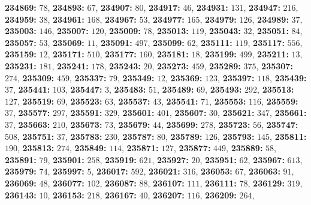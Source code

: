 \textsf{\bfseries 234869:} $78$, \textsf{\bfseries 234893:} $67$, \textsf{\bfseries 234907:} $80$, \textsf{\bfseries 234917:} $46$, \textsf{\bfseries 234931:} $131$, \textsf{\bfseries 234947:} $216$, \textsf{\bfseries 234959:} $38$, \textsf{\bfseries 234961:} $168$, \textsf{\bfseries 234967:} $53$, \textsf{\bfseries 234977:} $165$, \textsf{\bfseries 234979:} $126$, \textsf{\bfseries 234989:} $37$, \textsf{\bfseries 235003:} $146$, \textsf{\bfseries 235007:} $120$, \textsf{\bfseries 235009:} $78$, \textsf{\bfseries 235013:} $119$, \textsf{\bfseries 235043:} $32$, \textsf{\bfseries 235051:} $84$, \textsf{\bfseries 235057:} $53$, \textsf{\bfseries 235069:} $11$, \textsf{\bfseries 235091:} $497$, \textsf{\bfseries 235099:} $62$, \textsf{\bfseries 235111:} $119$, \textsf{\bfseries 235117:} $556$, \textsf{\bfseries 235159:} $12$, \textsf{\bfseries 235171:} $510$, \textsf{\bfseries 235177:} $160$, \textsf{\bfseries 235181:} $18$, \textsf{\bfseries 235199:} $499$, \textsf{\bfseries 235211:} $13$, \textsf{\bfseries 235231:} $181$, \textsf{\bfseries 235241:} $178$, \textsf{\bfseries 235243:} $20$, \textsf{\bfseries 235273:} $459$, \textsf{\bfseries 235289:} $375$, \textsf{\bfseries 235307:} $274$, \textsf{\bfseries 235309:} $459$, \textsf{\bfseries 235337:} $79$, \textsf{\bfseries 235349:} $12$, \textsf{\bfseries 235369:} $123$, \textsf{\bfseries 235397:} $118$, \textsf{\bfseries 235439:} $37$, \textsf{\bfseries 235441:} $103$, \textsf{\bfseries 235447:} $3$, \textsf{\bfseries 235483:} $51$, \textsf{\bfseries 235489:} $69$, \textsf{\bfseries 235493:} $292$, \textsf{\bfseries 235513:} $127$, \textsf{\bfseries 235519:} $69$, \textsf{\bfseries 235523:} $63$, \textsf{\bfseries 235537:} $43$, \textsf{\bfseries 235541:} $71$, \textsf{\bfseries 235553:} $116$, \textsf{\bfseries 235559:} $37$, \textsf{\bfseries 235577:} $297$, \textsf{\bfseries 235591:} $329$, \textsf{\bfseries 235601:} $401$, \textsf{\bfseries 235607:} $30$, \textsf{\bfseries 235621:} $347$, \textsf{\bfseries 235661:} $37$, \textsf{\bfseries 235663:} $210$, \textsf{\bfseries 235673:} $73$, \textsf{\bfseries 235679:} $44$, \textsf{\bfseries 235699:} $278$, \textsf{\bfseries 235723:} $56$, \textsf{\bfseries 235747:} $508$, \textsf{\bfseries 235751:} $37$, \textsf{\bfseries 235783:} $230$, \textsf{\bfseries 235787:} $80$, \textsf{\bfseries 235789:} $126$, \textsf{\bfseries 235793:} $145$, \textsf{\bfseries 235811:} $190$, \textsf{\bfseries 235813:} $274$, \textsf{\bfseries 235849:} $114$, \textsf{\bfseries 235871:} $127$, \textsf{\bfseries 235877:} $449$, \textsf{\bfseries 235889:} $58$, \textsf{\bfseries 235891:} $79$, \textsf{\bfseries 235901:} $258$, \textsf{\bfseries 235919:} $621$, \textsf{\bfseries 235927:} $20$, \textsf{\bfseries 235951:} $62$, \textsf{\bfseries 235967:} $613$, \textsf{\bfseries 235979:} $74$, \textsf{\bfseries 235997:} $5$, \textsf{\bfseries 236017:} $592$, \textsf{\bfseries 236021:} $316$, \textsf{\bfseries 236053:} $67$, \textsf{\bfseries 236063:} $91$, \textsf{\bfseries 236069:} $48$, \textsf{\bfseries 236077:} $102$, \textsf{\bfseries 236087:} $88$, \textsf{\bfseries 236107:} $111$, \textsf{\bfseries 236111:} $78$, \textsf{\bfseries 236129:} $319$, \textsf{\bfseries 236143:} $10$, \textsf{\bfseries 236153:} $218$, \textsf{\bfseries 236167:} $40$, \textsf{\bfseries 236207:} $116$, \textsf{\bfseries 236209:} $264$, 
